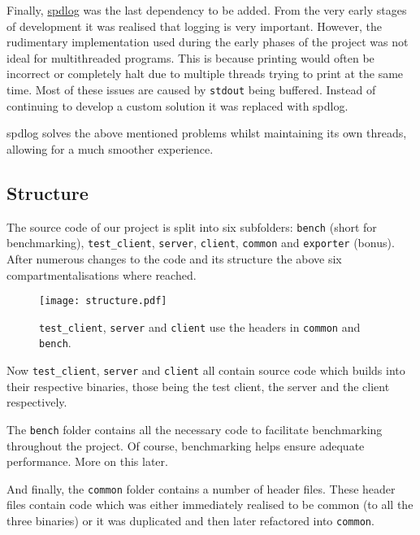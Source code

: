 \documentclass[article]{uom-coursework}
\begin{document}
Finally, \href{https://github.com/gabime/spdlog}{spdlog} was the
last dependency to be added. From the very early stages of
development it was realised that logging is very important.
However, the rudimentary implementation used during the early
phases of the project was not ideal for multithreaded programs.
This is because printing would often be incorrect or completely
halt due to multiple threads trying to print at the same time.
Most of these issues are caused by \texttt{stdout} being
buffered. Instead of continuing to develop a custom solution it
was replaced with spdlog.

spdlog solves the above mentioned problems whilst maintaining
its own threads, allowing for a much smoother experience.

\subsection{Structure}

The source code of our project is split into six subfolders:
\texttt{bench} (short for benchmarking), \texttt{test\_client},
\texttt{server}, \texttt{client}, \texttt{common} and
\texttt{exporter} (bonus). After numerous changes to the code
and its structure the above six compartmentalisations where
reached.

\begin{figure}[H]
\centering
\begin{mdframed}[backgroundcolor=OffWhite]
\texttt{[image: structure.pdf]}
\end{mdframed}
\caption{\texttt{test\_client}, \texttt{server} and
\texttt{client} use the headers in \texttt{common} and
\texttt{bench}.}
\label{fig:folderdeps}
\end{figure}

Now \texttt{test\_client}, \texttt{server} and \texttt{client}
all contain source code which builds into their respective
binaries, those being the test client, the server and the client
respectively.

The \texttt{bench} folder contains all the necessary code to
facilitate benchmarking throughout the project. Of course,
benchmarking helps ensure adequate performance. More on this
later.

And finally, the \texttt{common} folder contains a number of
header files. These header files contain code which was either
immediately realised to be common (to all the three binaries) or
it was duplicated and then later refactored into
\texttt{common}.
\end{document}
